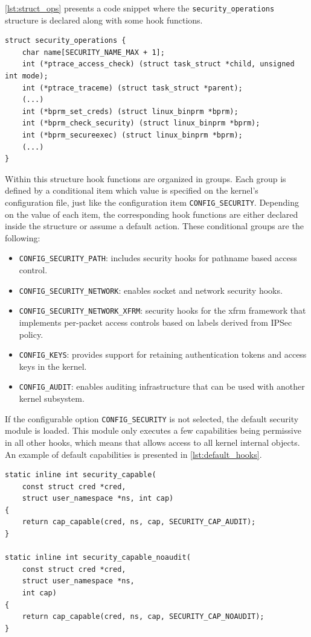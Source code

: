 \autoref{lst:struct_ops} presents a code snippet where the \texttt{security\_operations} structure is declared along with some hook functions.

\begin{lstlisting}[caption=Code snippet of the \texttt{security\_operations} structure (Linux kernel v3.11), label=lst:struct_ops]
struct security_operations {
	char name[SECURITY_NAME_MAX + 1];
	int (*ptrace_access_check) (struct task_struct *child, unsigned int mode);
	int (*ptrace_traceme) (struct task_struct *parent);
	(...)
	int (*bprm_set_creds) (struct linux_binprm *bprm);
	int (*bprm_check_security) (struct linux_binprm *bprm);
	int (*bprm_secureexec) (struct linux_binprm *bprm);
	(...)
}
\end{lstlisting}

Within this structure hook functions are organized in groups. Each group is defined by a conditional item which value is specified on the kernel's configuration file, just like the configuration item \texttt{CONFIG\_SECURITY}. Depending on the value of each item, the corresponding hook functions are either declared inside the structure or assume a default action. These conditional groups are the following:

\begin{itemize}
 \item \texttt{CONFIG\_SECURITY\_PATH}: includes security hooks for pathname based access control.
 \item \texttt{CONFIG\_SECURITY\_NETWORK}: enables socket and network security hooks.
 \item \texttt{CONFIG\_SECURITY\_NETWORK\_XFRM}: security hooks for the \gls{xfrm} framework that implements per-packet access controls based on labels derived from IPSec policy.
\item \texttt{CONFIG\_KEYS}: provides support for retaining authentication tokens and access keys in the kernel.
\item \texttt{CONFIG\_AUDIT}: enables auditing infrastructure that can be used with another kernel subsystem.
\end{itemize}

If the configurable option \texttt{CONFIG\_SECURITY} is not selected, the default security module is loaded. This module only executes a few capabilities being permissive in all other hooks, which means that allows access to all kernel internal objects. An example of default capabilities is presented in \autoref{lst:default_hooks}.

\begin{lstlisting}[caption=Code snippet of default security functions (Linux kernel v3.11), label=lst:default_hooks]
static inline int security_capable(
	const struct cred *cred,
	struct user_namespace *ns, int cap)
{
	return cap_capable(cred, ns, cap, SECURITY_CAP_AUDIT);
}

static inline int security_capable_noaudit(
	const struct cred *cred,
	struct user_namespace *ns,
	int cap)
{
	return cap_capable(cred, ns, cap, SECURITY_CAP_NOAUDIT);
}
\end{lstlisting}

